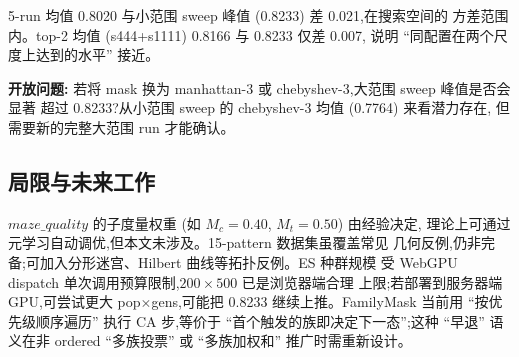 5-run 均值 0.8020 与小范围 sweep 峰值 (0.8233) 差 0.021,在搜索空间的
方差范围内。top-2 均值 (s444+s1111) 0.8166 与 0.8233 仅差 0.007,
说明 ``同配置在两个尺度上达到的水平'' 接近。

\medskip\noindent\textbf{开放问题:}
若将 mask 换为 manhattan-3 或 chebyshev-3,大范围 sweep 峰值是否会显著
超过 0.8233?从小范围 sweep 的 chebyshev-3 均值 (0.7764) 来看潜力存在,
但需要新的完整大范围 run 才能确认。

\subsection{局限与未来工作}
\label{sec:limitations}

$maze\_quality$ 的子度量权重 (如 $M_c=0.40$, $M_t=0.50$) 由经验决定,
理论上可通过元学习自动调优,但本文未涉及。15-pattern 数据集虽覆盖常见
几何反例,仍非完备;可加入分形迷宫、Hilbert 曲线等拓扑反例。ES 种群规模
受 WebGPU dispatch 单次调用预算限制,$200\!\times\!500$ 已是浏览器端合理
上限;若部署到服务器端 GPU,可尝试更大 pop$\times$gens,可能把 0.8233
继续上推。FamilyMask 当前用 ``按优先级顺序遍历'' 执行 CA 步,等价于
``首个触发的族即决定下一态'';这种 ``早退'' 语义在非 ordered
``多族投票'' 或 ``多族加权和'' 推广时需重新设计。
